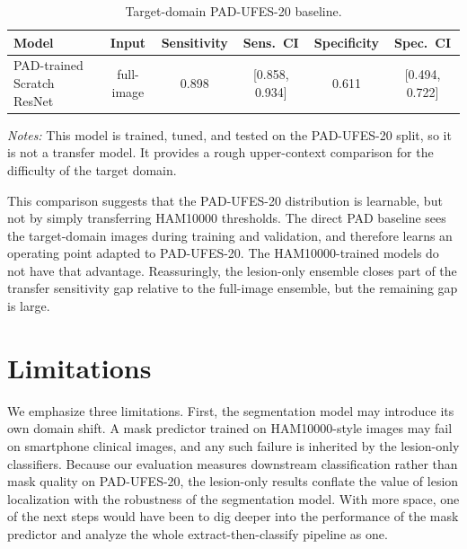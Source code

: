 \documentclass[10pt]{article}
\begin{document}
\begin{table}[t]
    \centering
    \begin{threeparttable}
    \caption{Target-domain PAD-UFES-20 baseline.}
    \label{tab:pad_baseline}
    \footnotesize
    \begin{tabular}{lccccc}
        \toprule
        Model & Input & Sensitivity & Sens.\ CI & Specificity & Spec.\ CI \\
        \midrule
        PAD-trained Scratch ResNet & full-image & 0.898 & [0.858, 0.934] & 0.611 & [0.494, 0.722] \\
        \bottomrule
    \end{tabular}
    \begin{tablenotes}[para]
        \footnotesize
        \item \emph{Notes:} This model is trained, tuned, and tested on the PAD-UFES-20 split, so it is not a transfer model. It provides a rough upper-context comparison for the difficulty of the target domain.
    \end{tablenotes}
    \end{threeparttable}
\end{table}

This comparison suggests that the PAD-UFES-20 distribution is learnable, but not by simply transferring HAM10000 thresholds. The direct PAD baseline sees the target-domain images during training and validation, and therefore learns an operating point adapted to PAD-UFES-20. The HAM10000-trained models do not have that advantage. Reassuringly, the lesion-only ensemble closes part of the transfer sensitivity gap relative to the full-image ensemble, but the remaining gap is large.

\section{Limitations}

We emphasize three limitations. First, the segmentation model may introduce its own domain shift. A mask predictor trained on HAM10000-style images may fail on smartphone clinical images, and any such failure is inherited by the lesion-only classifiers. Because our evaluation measures downstream classification rather than mask quality on PAD-UFES-20, the lesion-only results conflate the value of lesion localization with the robustness of the segmentation model. With more space, one of the next steps would have been to dig deeper into the performance of the mask predictor and analyze the whole extract-then-classify pipeline as one.
\end{document}
